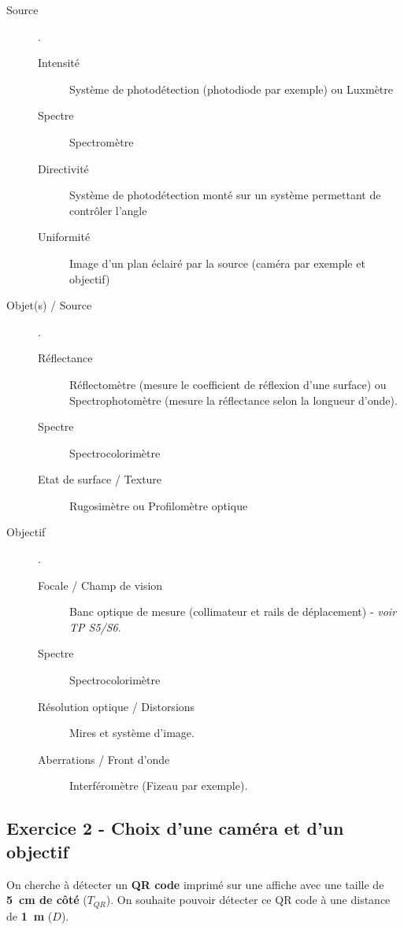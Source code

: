 \documentclass[a4paper,11pt,twoside]{book} %
\begin{document}
\begin{description}
	\item[Source] .
	\begin{description}
		\item[Intensité] Système de photodétection (photodiode par exemple) ou Luxmètre
		\item[Spectre] Spectromètre
		\item[Directivité] Système de photodétection monté sur un système permettant de contrôler l'angle
		\item[Uniformité] Image d'un plan éclairé par la source (caméra par exemple et objectif)
	\end{description}		

	\item[Objet(s) / Source] .
	\begin{description}
		\item[Réflectance] Réflectomètre (mesure le coefficient de réflexion d'une surface) ou Spectrophotomètre (mesure la réflectance selon la longueur d'onde).
		\item[Spectre] Spectrocolorimètre
		\item[Etat de surface / Texture] Rugosimètre ou Profilomètre optique
	\end{description}
	
	\item[Objectif] .
	\begin{description}
		\item[Focale / Champ de vision] Banc optique de mesure (collimateur et rails de déplacement) - \textit{voir TP S5/S6}.
		\item[Spectre] Spectrocolorimètre
		\item[Résolution optique / Distorsions] Mires et système d'image.
		\item[Aberrations / Front d'onde] Interféromètre (Fizeau par exemple).
	\end{description}
\end{description}

\newpage
\subsection{Exercice 2 - Choix d'une caméra et d'un objectif}

On cherche à détecter un \textbf{QR code} imprimé sur une affiche avec une taille de \textbf{5~cm de côté} ($T_{QR}$). On souhaite pouvoir détecter ce QR code à une distance de \textbf{1~m} ($D$).
\end{document}
